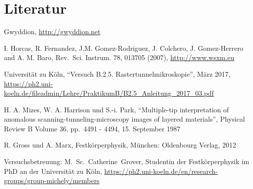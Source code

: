 \documentclass[12pt,a4paper]{scrartcl}
\numberwithin{equation}{section} %
\begin{document}
\clearpage
\hypertarget{literatur}{%
\section{Literatur}\label{literatur}}
\begin{thebibliography}{9}
	Gwyddion, \url{http://gwyddion.net}

	I. Horcas, R. Fernandez, J.M. Gomez-Rodriguez, J. Colchero, J. Gomez-Herrero and A. M. Baro, Rev.~Sci. Instrum. 78, 013705 (2007), \url{http://www.wsxm.eu}

	Universität zu Köln, ``Versuch B.2.5. Rastertunnelmikroskopie'', März 2017, 	\url{https://ph2.uni-koeln.de/fileadmin/Lehre/PraktikumB/B2.5_Anleitung_2017_03.pdf}

	H. A. Mizes, W. A. Harrison und S.-i. Park, ``Multiple-tip interpretation of anomalous scanning-tunneling-microscopy images of layered materials'', Physical Review B Volume 36, pp.~4491 - 4494, 15. September 1987

	R. Gross und A. Marx, Festkörperphysik, München: Oldenbourg Verlag, 2012

	Versuchsbetreuung: M.~Sc.~Catherine~Grover, Studentin der Festkörperphysik im PhD an der Universität zu Köln, \url{https://ph2.uni-koeln.de/en/research-groups/group-michely/members}
\end{thebibliography}
\end{document}
